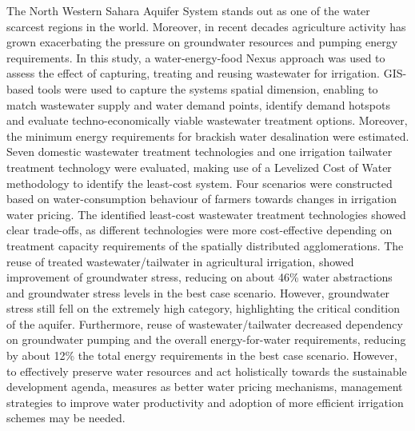 The North Western Sahara Aquifer System stands out as one of the water scarcest regions in the world. Moreover, in recent decades agriculture activity has grown exacerbating the pressure on groundwater resources and pumping energy requirements. In this study, a water-energy-food Nexus approach was used to assess the effect of capturing, treating and reusing wastewater for irrigation. GIS-based tools were used to capture the systems spatial dimension, enabling to match wastewater supply and water demand points, identify demand hotspots and evaluate techno-economically viable wastewater treatment options. Moreover, the minimum energy requirements for brackish water desalination were estimated. Seven domestic wastewater treatment technologies and one irrigation tailwater treatment technology were evaluated, making use of a Levelized Cost of Water methodology to identify the least-cost system. Four scenarios were constructed based on water-consumption behaviour of farmers towards changes in irrigation water pricing. The identified least-cost wastewater treatment technologies showed clear trade-offs, as different technologies were more cost-effective depending on treatment capacity requirements of the spatially distributed agglomerations. The reuse of treated wastewater/tailwater in agricultural irrigation, showed improvement of groundwater stress, reducing on about 46\% water abstractions and groundwater stress levels in the best case scenario. However, groundwater stress still fell on the extremely high category, highlighting the critical condition of the aquifer. Furthermore, reuse of wastewater/tailwater decreased dependency on groundwater pumping and the overall energy-for-water requirements, reducing by about 12\% the total energy requirements in the best case scenario. However, to effectively preserve water resources and act holistically towards the sustainable development agenda, measures as better water pricing mechanisms, management strategies to improve water productivity and adoption of more efficient irrigation schemes may be needed.